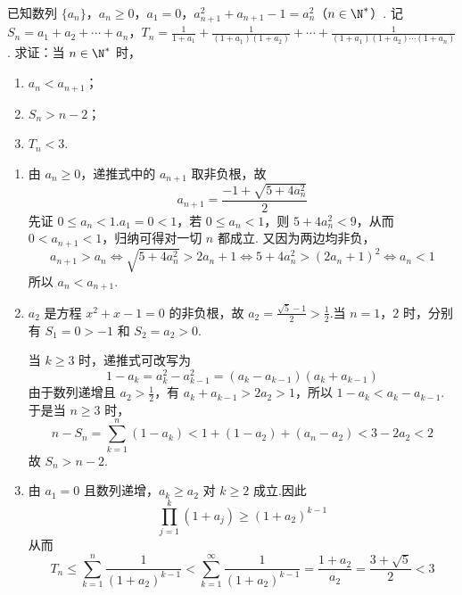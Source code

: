 \begin{problem}
已知数列 \(\{a_{n}\}\)，\(a_{n} \geqslant 0\)，\(a_{1} = 0\)，\(a_{n+1}^{2} + a_{n+1} - 1 = a_{n}^{2}\)（\(n \in \N^*\)）. 记 \(S_{n} = a_{1} + a_{2} + \cdots + a_{n}\)，\(T_{n} = \frac{1}{1 + a_{1}} + \frac{1}{(1 + a_{1})(1 + a_{2})} + \cdots + \frac{1}{(1 + a_1)(1 + a_2)\cdots(1 + a_n)}\). 求证：当 \(n\in \N^*\) 时，

\begin{enumerate}
\item \(a_{n} < a_{n + 1}\)；
\item \(S_{n} > n - 2\)；
\item \(T_{n} < 3\).
\end{enumerate}

\begin{solution}
\begin{enumerate}
\item 由 \(a_n\geqslant0\)，递推式中的 \(a_{n+1}\) 取非负根，故
\[
a_{n+1}=\frac{-1+\sqrt{5+4a_n^2}}2
\]
先证 \(0\leqslant a_n<1\).\(a_1=0<1\)，若 \(0\leqslant a_n<1\)，则
\(5+4a_n^2<9\)，从而 \(0<a_{n+1}<1\)，归纳可得对一切 \(n\) 都成立.
又因为两边均非负，
\[
a_{n+1}>a_n\Longleftrightarrow\sqrt{5+4a_n^2}>2a_n+1
\Longleftrightarrow 5+4a_n^2>(2a_n+1)^2
\Longleftrightarrow a_n<1
\]
所以 \(a_n<a_{n+1}\).
\item \(a_2\) 是方程 \(x^2+x-1=0\) 的非负根，故
\(a_2=\frac{\sqrt5-1}{2}>\frac12\).当 \(n=1\)，\(2\) 时，分别有
\(S_1=0>-1\) 和 \(S_2=a_2>0\).

当 \(k\geqslant3\) 时，递推式可改写为
\[
1-a_k=a_k^2-a_{k-1}^2=(a_k-a_{k-1})(a_k+a_{k-1})
\]
由于数列递增且 \(a_2>\frac12\)，有 \(a_k+a_{k-1}>2a_2>1\)，所以
\(1-a_k<a_k-a_{k-1}\).于是当 \(n\geqslant3\) 时，
\[
n-S_n=\sum_{k=1}^{n}(1-a_k)
<1+(1-a_2)+(a_n-a_2)<3-2a_2<2
\]
故 \(S_n>n-2\).
\item 由 \(a_1=0\) 且数列递增，\(a_k\geqslant a_2\) 对 \(k\geqslant2\) 成立.因此
\[
\prod_{j=1}^{k}(1+a_j)\geqslant(1+a_2)^{k-1}
\]
从而
\[
T_n\leqslant\sum_{k=1}^{n}\frac1{(1+a_2)^{k-1}}
<\sum_{k=1}^{\infty}\frac1{(1+a_2)^{k-1}}
=\frac{1+a_2}{a_2}=\frac{3+\sqrt5}{2}<3
\]
\end{enumerate}
\end{solution}
\end{problem}
